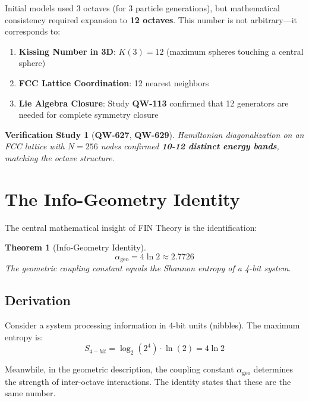 \documentclass[11pt, a4paper]{article}
\newtheorem{theorem}{Theorem}[section]
\newtheorem{verification}{Verification Study}[section]
\theoremstyle{remark}
\newcommand{\alphageo}{\alpha_{\text{geo}}}
\newcommand{\QW}[1]{\textbf{QW-#1}}
\begin{document}
Initial models used 3 octaves (for 3 particle generations), but mathematical consistency required expansion to \textbf{12 octaves}. This number is not arbitrary—it corresponds to:

\begin{enumerate}
    \item \textbf{Kissing Number in 3D}: $K(3) = 12$ (maximum spheres touching a central sphere)
    \item \textbf{FCC Lattice Coordination}: 12 nearest neighbors
    \item \textbf{Lie Algebra Closure}: Study \QW{113} confirmed that 12 generators are needed for complete symmetry closure
\end{enumerate}

\begin{verification}[\QW{627}, \QW{629}]
Hamiltonian diagonalization on an FCC lattice with $N=256$ nodes confirmed \textbf{10-12 distinct energy bands}, matching the octave structure.
\end{verification}

\section{The Info-Geometry Identity}

The central mathematical insight of FIN Theory is the identification:

\begin{theorem}[Info-Geometry Identity]
\begin{equation}
\boxed{\alphageo = 4 \ln 2 \approx 2.7726}
\label{eq:info_geo_identity}
\end{equation}
The geometric coupling constant equals the Shannon entropy of a 4-bit system.
\end{theorem}

\subsection{Derivation}

Consider a system processing information in 4-bit units (nibbles). The maximum entropy is:
\begin{equation}
S_{4-bit} = \log_2(2^4) \cdot \ln(2) = 4 \ln 2
\end{equation}

Meanwhile, in the geometric description, the coupling constant $\alphageo$ determines the strength of inter-octave interactions. The identity states that these are the same number.
\end{document}
